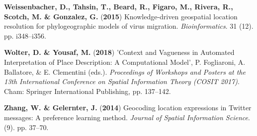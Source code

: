 \documentclass[10pt,]{article}
\newenvironment{cslreferences}%
  {}%
  {\par}
\begin{document}
\begin{cslreferences}
\leavevmode\hypertarget{ref-weissenbacher2015}{}%
\textbf{Weissenbacher, D., Tahsin, T., Beard, R., Figaro, M., Rivera,
R., Scotch, M. \& Gonzalez, G.} (\textbf{2015}) Knowledge-driven
geospatial location resolution for phylogeographic models of virus
migration. \emph{Bioinformatics}. 31 (12). pp. i348--i356.

\leavevmode\hypertarget{ref-wolter2018}{}%
\textbf{Wolter, D. \& Yousaf, M.} (\textbf{2018}) 'Context and Vagueness
in Automated Interpretation of Place Description: A Computational
Model', P. Fogliaroni, A. Ballatore, \& E. Clementini (eds.).
\emph{Proceedings of Workshops and Posters at the 13th International
Conference on Spatial Information Theory (COSIT 2017)}. Cham: Springer
International Publishing, pp. 137--142.

\leavevmode\hypertarget{ref-zhang2014}{}%
\textbf{Zhang, W. \& Gelernter, J.} (\textbf{2014}) Geocoding location
expressions in Twitter messages: A preference learning method.
\emph{Journal of Spatial Information Science}. (9). pp. 37--70.
\end{cslreferences}
\end{document}
